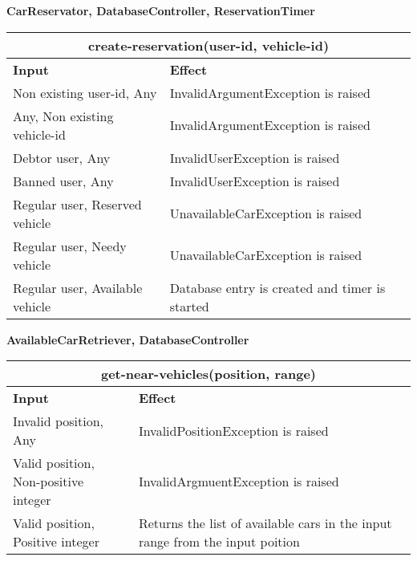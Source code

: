 \textbf{CarReservator, DatabaseController, ReservationTimer} \\
\begin{tabular}{|p{5cm}|p{7cm}|}
\hline
\multicolumn{2}{|c|}{create-reservation(user-id, vehicle-id)} \\
\hline
\textbf{Input} & \textbf{Effect} \\

\hline
Non existing user-id, Any & InvalidArgumentException is raised \\

\hline
Any, Non existing vehicle-id & InvalidArgumentException is raised \\

\hline
Debtor user, Any & InvalidUserException is raised \\

\hline
Banned user, Any & InvalidUserException is raised \\

\hline
Regular user, Reserved vehicle & UnavailableCarException is raised \\

\hline
Regular user, Needy vehicle & UnavailableCarException is raised \\

\hline
Regular user, Available vehicle & Database entry is created and timer is started \\
\hline
\end{tabular}

\textbf{AvailableCarRetriever, DatabaseController} \\
\begin{tabular}{|p{5cm}|p{7cm}|}
\hline
\multicolumn{2}{|c|}{get-near-vehicles(position, range)} \\
\hline
\textbf{Input} & \textbf{Effect} \\

\hline
Invalid position, Any & InvalidPositionException is raised \\

\hline
Valid position, Non-positive integer & InvalidArgmuentException is raised \\

\hline
Valid position, Positive integer & Returns the list of available cars in the input range from the input poition \\
\hline
\end{tabular}
